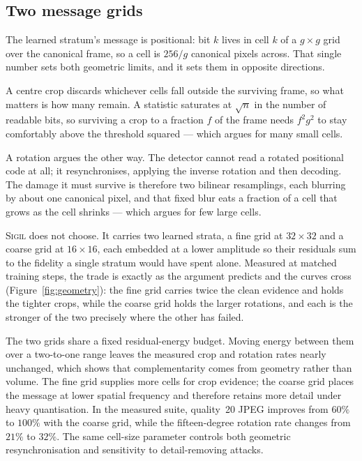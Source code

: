 \documentclass[10pt,twocolumn]{article}
\theoremstyle{definition}
\theoremstyle{remark}
\newcommand{\sigil}{\textsc{Sigil}}
\begin{document}
\subsection{Two message grids}
\label{sec:grids}

The learned stratum's message is positional: bit $k$ lives in cell $k$ of a
$g\times g$ grid over the canonical frame, so a cell is $256/g$ canonical pixels
across. That single number sets both geometric limits, and it sets them in
opposite directions.

A centre crop discards whichever cells fall outside the surviving frame, so what
matters is how many remain. A statistic saturates at $\sqrt{n}$ in the number of
readable bits, so surviving a crop to a fraction $f$ of the frame needs
$f^{2}g^{2}$ to stay comfortably above the threshold squared --- which argues for
many small cells.

A rotation argues the other way. The detector cannot read a rotated positional
code at all; it resynchronises, applying the inverse rotation and then decoding.
The damage it must survive is therefore two bilinear resamplings, each blurring
by about one canonical pixel, and that fixed blur eats a fraction of a cell that
grows as the cell shrinks --- which argues for few large cells.

\sigil{} does not choose. It carries two learned strata, a fine grid at
$32\times32$ and a coarse grid at $16\times16$, each embedded at a lower
amplitude so their residuals sum to the fidelity a single stratum would have
spent alone. Measured at matched training steps, the trade is exactly as the
argument predicts and the curves cross (Figure~\ref{fig:geometry}): the fine grid
carries twice the clean evidence and holds the tighter crops, while the coarse
grid holds the larger rotations, and each is the stronger of the two precisely
where the other has failed.

The two grids share a fixed residual-energy budget. Moving energy between them
over a two-to-one range leaves the measured crop and rotation rates nearly
unchanged, which shows that complementarity comes from geometry rather than
volume. The fine grid supplies more cells for crop evidence; the coarse grid
places the message at lower spatial frequency and therefore retains more detail
under heavy quantisation. In the measured suite, quality~20 JPEG improves from
$60\%$ to $100\%$ with the coarse grid, while the fifteen-degree rotation rate
changes from $21\%$ to $32\%$. The same cell-size parameter controls both
geometric resynchronisation and sensitivity to detail-removing attacks.
\end{document}
